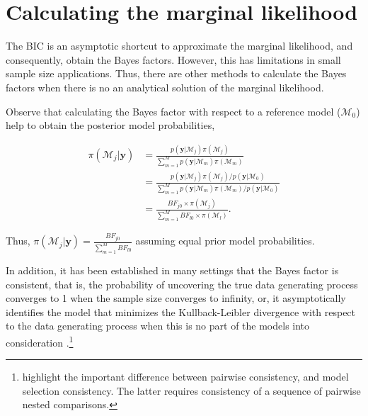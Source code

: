 
\section{Calculating the marginal likelihood}\label{sec10_4}

The BIC is an asymptotic shortcut to approximate the marginal likelihood, and consequently, obtain the Bayes factors. However, this has limitations in small sample size applications. Thus, there are other methods to calculate the Bayes factors when there is no an analytical solution of the marginal likelihood.

Observe that calculating the Bayes factor with respect to a reference model ($\mathcal{M}_0$) help to obtain the posterior model probabilities,

\begin{align*}
	\pi(\mathcal{M}_j |\bm{y})&=\frac{p(\bm{y} | \mathcal{M}_j)\pi(\mathcal{M}_j)}{\sum_{m=1}^{M}p(\bm{y} | \mathcal{M}_m)\pi(\mathcal{M}_m)}\\
	&=\frac{p(\bm{y} | \mathcal{M}_j)\pi(\mathcal{M}_j)/p(\bm{y} | \mathcal{M}_0)}{\sum_{m=1}^{M}p(\bm{y} | \mathcal{M}_m)\pi(\mathcal{M}_m)/p(\bm{y} | \mathcal{M}_0)}\\
	&=\frac{BF_{j0}\times\pi(\mathcal{M}_j)}{\sum_{m=1}^{M}BF_{l0}\times\pi(\mathcal{M}_l)}.
\end{align*}

Thus, $\pi(\mathcal{M}_j |\bm{y})=\frac{BF_{j0}}{\sum_{m=1}^{M}BF_{l0}}$ assuming equal prior model probabilities.

In addition, it has been established in many settings that the Bayes factor is consistent, that is, the probability of uncovering the true data generating process converges to 1 when the sample size converges to infinity, or, it asymptotically identifies the model that minimizes the Kullback-Leibler divergence with respect to the data generating process when this is no part of the models into consideration \cite{chib2016bayes,walker2004new,walker2004modern}.\footnote{\cite{Johnson2012} highlight the important difference between pairwise consistency, and model selection consistency. The latter requires consistency of a sequence of pairwise nested comparisons.}  

